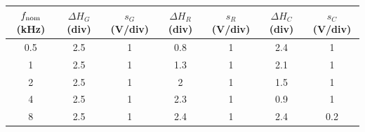 \begin{center}
\begin{minipage}{\linewidth}\centering
\small
\setlength{\tabcolsep}{5pt}
\label{tab:rc_escalas}
\begin{tabular}{ccccccc}
\toprule
$f_{\rm nom}$ (kHz) & $\Delta H_G$ (div) & $s_G$ (V/div) & $\Delta H_R$ (div) & $s_R$ (V/div) & $\Delta H_C$ (div) & $s_C$ (V/div) \\
\midrule
\num{0.5} & \num{2.5} & \num{1} & \num{0.8} & \num{1} & \num{2.4} & \num{1} \\
\num{1} & \num{2.5} & \num{1} & \num{1.3} & \num{1} & \num{2.1} & \num{1} \\
\num{2} & \num{2.5} & \num{1} & \num{2} & \num{1} & \num{1.5} & \num{1} \\
\num{4} & \num{2.5} & \num{1} & \num{2.3} & \num{1} & \num{0.9} & \num{1} \\
\num{8} & \num{2.5} & \num{1} & \num{2.4} & \num{1} & \num{2.4} & \num{0.2} \\
\bottomrule
\end{tabular}
\end{minipage}
\end{center}

